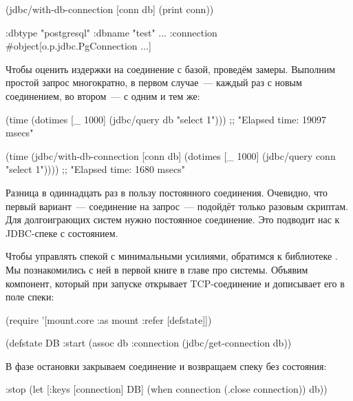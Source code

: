 \begin{english}
  \begin{clojure/lines}
(jdbc/with-db-connection [conn db]
  (print conn))

{:dbtype "postgresql"
 :dbname "test"
 ...
 :connection #object[o.p.jdbc.PgConnection ...]}
  \end{clojure/lines}
\end{english}

Чтобы оценить издержки на соединение с базой, проведём замеры. Выполним простой запрос многократно, в первом случае~--- каждый раз с новым соединением, во втором~--- с одним и тем же:

\begin{english}
  \begin{clojure}
(time (dotimes [_ 1000]
        (jdbc/query db "select 1")))
;; "Elapsed time: 19097 msecs"

(time
 (jdbc/with-db-connection [conn db]
   (dotimes [_ 1000]
     (jdbc/query conn "select 1"))))
;; "Elapsed time:  1680 msecs"
  \end{clojure}
\end{english}

Разница в одиннадцать раз в пользу постоянного соединения. Очевидно, что первый вариант~--- соединение на запрос~--- подойдёт только разовым скриптам. Для долгоиграющих систем нужно постоянное соединение. Это подводит нас к JDBC-спеке с состоянием.

Чтобы управлять спекой с минимальными усилиями, обратимся к библиотеке . Мы познакомились с ней в первой книге в главе про системы. Объявим компонент, который при запуске открывает TCP-соединение и дописывает его в поле  спеки:


\begin{english}
  \begin{clojure}
(require
  '[mount.core :as mount :refer [defstate]])

(defstate DB
  :start
  (assoc db :connection
         (jdbc/get-connection db))
  \end{clojure}
\end{english}

В фазе остановки закрываем соединение и возвращаем спеку без состояния:

\begin{english}
  \begin{clojure}
  :stop
  (let [{:keys [connection]} DB]
    (when connection
      (.close connection))
    db))
  \end{clojure}
\end{english}

